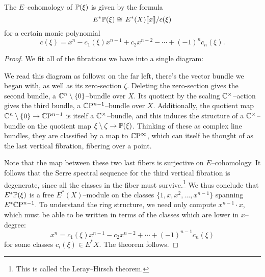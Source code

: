 \begin{theorem}\label{CohomologyOfProjectivization}
The $E$--cohomology of $\P(\xi)$ is given by the formula \[E^* \P(\xi) \cong \left. E^*(X) \llbracket x \rrbracket \middle/ c(\xi) \right.\] for a certain monic polynomial \[c(\xi) = x^n - c_1(\xi) x^{n-1} + c_2 x^{n-2} - \cdots + (-1)^n c_n(\xi).\]
\end{theorem}
\begin{proof}
We fit all of the fibrations we have into a single diagram:
\begin{center}
\end{center}
We read this diagram as follows: on the far left, there's the vector bundle we began with, as well as its zero-section $\zeta$.  Deleting the zero-section gives the second bundle, a $\C^n \setminus \{0\}$--bundle over $X$.  Its quotient by the scaling $\C^\times$--action gives the third bundle, a $\CP^{n-1}$--bundle over $X$.  Additionally, the quotient map $\C^n \setminus \{0\} \to \CP^{n-1}$ is itself a $\C^\times$--bundle, and this induces the structure of a $\C^\times$--bundle on the quotient map $\xi \setminus \zeta \to \P(\xi)$.  Thinking of these as complex line bundles, they are classified by a map to $\CP^\infty$, which can itself be thought of as the last vertical fibration, fibering over a point.

Note that the map between these two last fibers is surjective on $E$--cohomology.  It follows that the Serre spectral sequence for the third vertical fibration is degenerate, since all the classes in the fiber must survive.\footnote{This is called the Leray--Hirsch theorem.}  We thus conclude that $E^* \P(\xi)$ is a free $E^*(X)$--module on the classes $\{1, x, x^2, \ldots, x^{n-1}\}$ spanning $E^* \CP^{n-1}$.  To understand the ring structure, we need only compute $x^{n-1} \cdot x$, which must be able to be written in terms of the classes which are lower in $x$--degree: \[x^n = c_1(\xi) x^{n-1} - c_2 x^{n-2} + \cdots + (-1)^{n-1} c_n(\xi)\] for some classes $c_i(\xi) \in E^* X$.  The theorem follows.
\end{proof}

